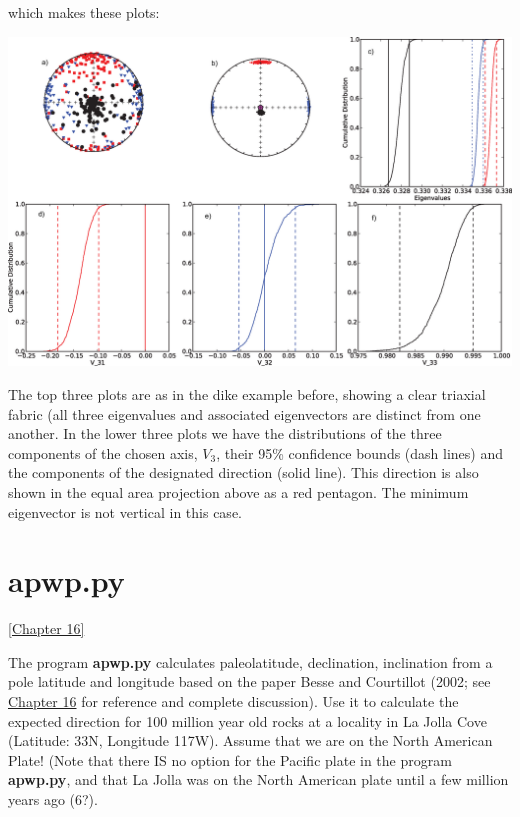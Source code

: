 \documentclass[11pt]{book}
\begin{document}
{{{{ which makes these plots:
 
   \includegraphics[width=20 cm]{EPSfiles/sed-aniso.eps}
   
   The top three plots are as in the dike example before, showing a clear triaxial fabric (all three eigenvalues and associated eigenvectors are distinct from one another.  In the lower three plots we have the distributions of the three components of the chosen axis,  $V_3$, their 95\% confidence bounds (dash lines) and the components of the designated direction (solid line).  This direction is also shown in the equal area projection above as a red pentagon.  The minimum eigenvector is not vertical in this case.    
 


\section {\bf apwp.py }
\href{http://magician.ucsd.edu/Essentials/Webbookcopy.html#Tectonic_applications_of_paleomagnetism}{[Chapter 16]}
\label{apwp}

The program {\bf apwp.py} calculates paleolatitude, declination, inclination from  a pole latitude and longitude based on  the paper Besse and Courtillot (2002; see  \href{http://magician.ucsd.edu/Essentials/Webbookcopy.html#x1-19500016}{Chapter 16} for reference and complete discussion).  
Use it  to calculate the expected direction for 100 million year old rocks at a locality in La Jolla Cove (Latitude: 33N, Longitude 117W).    Assume that we are on the North American Plate!  (Note that there IS no option for the Pacific plate in the program {\bf apwp.py}, and that La Jolla was on the North American plate until a few million years ago (6?).   

}}}}
\end{document}
